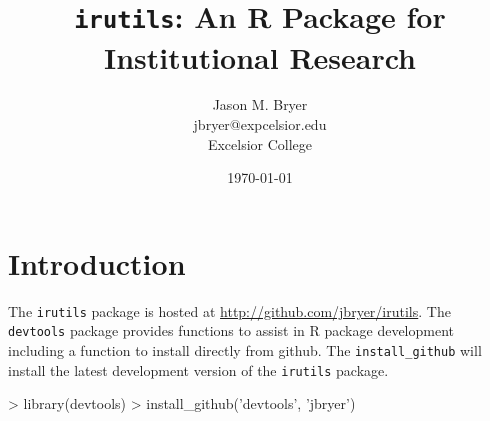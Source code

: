 \documentclass[letterpaper,11pt]{article}
\begin{document}
\title{\texttt{irutils}: An R Package for Institutional Research}
\author{Jason M. Bryer\\
\small{}jbryer@expcelsior.edu\\
Excelsior College}
\date{\today}

\maketitle



\section{Introduction}

The \texttt{irutils} package is hosted at \url{http://github.com/jbryer/irutils}. The \texttt{devtools} \cite{devtools} package provides functions to assist in R package development including a function to install directly from github. The \texttt{install\_github} will install the latest development version of the \texttt{irutils} package.

\begin{Schunk}
\begin{Sinput}
> library(devtools)
> install_github('devtools', 'jbryer')
\end{Sinput}
\end{Schunk}
\end{document}
